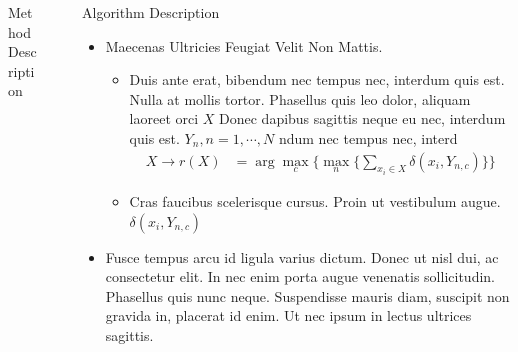 \documentclass[final,hyperref={pdfpagelabels=false}]{beamer}
\begin{document}
\begin{frame}[t]
\begin{columns}[t]
\begin{column}{0.47\textwidth}
\begin{block}{Method Description}
\end{block}


\end{column} %

\begin{column}{.02\textwidth}\end{column} %
 
\begin{column}{.48\textwidth} %



\begin{block}{Algorithm Description}
	
	\begin{itemize}
		\item Maecenas Ultricies Feugiat Velit Non Mattis.
		\begin{itemize}
			\item Duis ante erat, bibendum nec tempus nec, interdum quis est. Nulla at mollis tortor. Phasellus quis leo dolor, aliquam laoreet orci $X$ Donec dapibus sagittis neque eu nec, interdum quis est. $Y_n, n=1,\cdots,N$ ndum nec tempus nec, interd
			\begin{align*}
			X \rightarrow r(X) & = \arg \max_{c} \Big\{ \max_n \big\{ \sum_{x_i \in X} \delta(x_i,Y_{n,c})\big\} \Big\} 
			\end{align*}
			\item Cras faucibus scelerisque cursus. Proin ut vestibulum augue. $\delta(x_i,Y_{n,c})$
		\end{itemize}
		\item Fusce tempus arcu id ligula varius dictum. Donec ut nisl dui, ac consectetur elit. In nec enim porta augue venenatis sollicitudin. Phasellus quis nunc neque. Suspendisse mauris diam, suscipit non gravida in, placerat id enim. Ut nec ipsum in lectus ultrices sagittis.
	\end{itemize}
	
\end{block}



\end{column}
\end{columns}
\end{frame}
\end{document}
